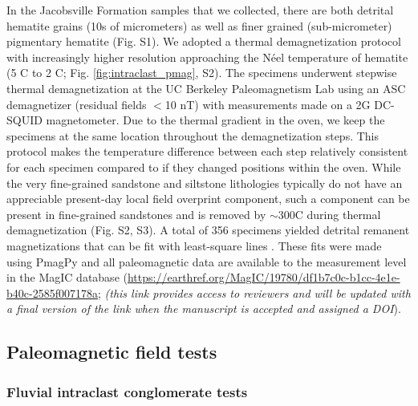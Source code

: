 In the Jacobsville Formation samples that we collected, there are both detrital hematite grains (10s of micrometers) as well as finer grained (sub-micrometer) pigmentary hematite (Fig. S1). We adopted a thermal demagnetization protocol with increasingly higher resolution approaching the N\'eel temperature of hematite (5 \textdegree C to 2 \textdegree C; Fig. \ref{fig:intraclast_pmag}, S2). The specimens underwent stepwise thermal demagnetization at the UC Berkeley Paleomagnetism Lab using an ASC demagnetizer (residual fields $<$10 nT) with measurements made on a 2G DC-SQUID magnetometer. Due to the thermal gradient in the oven, we keep the specimens at the same location throughout the demagnetization steps. This protocol makes the temperature difference between each step relatively consistent for each specimen compared to if they changed positions within the oven. While the very fine-grained sandstone and siltstone lithologies typically do not have an appreciable present-day local field overprint component, such a component can be present in fine-grained sandstones and is removed by $\sim$300\textdegree C during thermal demagnetization (Fig. S2, S3). A total of 356 specimens yielded detrital remanent magnetizations that can be fit with least-square lines \cite{Kirschvink1980a}. These fits were made using PmagPy \cite{Tauxe2016a} and all paleomagnetic data are available to the measurement level in the MagIC database (\url{https://earthref.org/MagIC/19780/df1b7c0c-b1cc-4e1e-b40c-2585f007178a}; \textit{(this link provides access to reviewers and will be updated with a final version of the link when the manuscript is accepted and assigned a DOI}).

\subsection*{Paleomagnetic field tests}

\subsubsection*{Fluvial intraclast conglomerate tests}

